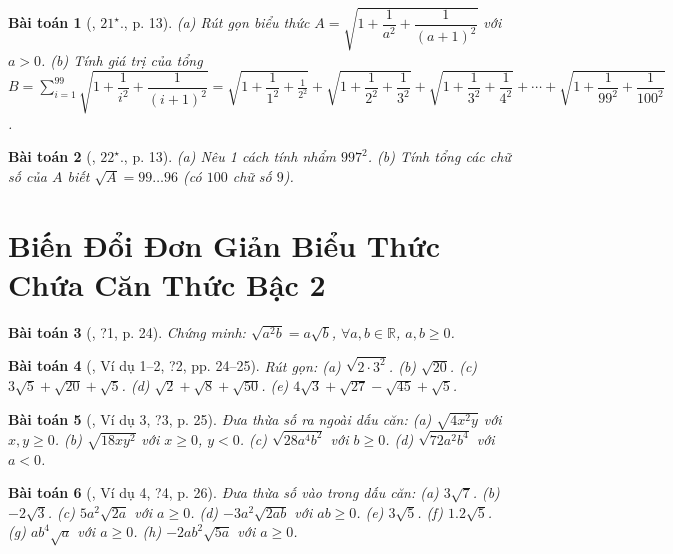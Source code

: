 \documentclass{article}
\newtheorem{baitoan}{Bài toán}
\begin{document}
\begin{baitoan}[\cite{Binh_Toan_9_tap_1}, $21^\star$., p. 13]
	(a) Rút gọn biểu thức $A = \sqrt{1 + \dfrac{1}{a^2} + \dfrac{1}{(a + 1)^2}}$ với $a > 0$. (b) Tính giá trị của tổng $B = \sum_{i=1}^{99} \sqrt{1 + \dfrac{1}{i^2} + \dfrac{1}{(i + 1)^2}} = \sqrt{1 + \dfrac{1}{1^2} + \frac{1}{2^2}} + \sqrt{1 + \dfrac{1}{2^2} + \dfrac{1}{3^2}} + \sqrt{1 + \dfrac{1}{3^2} + \dfrac{1}{4^2}} + \cdots + \sqrt{1 + \dfrac{1}{99^2} + \dfrac{1}{100^2}}$.
\end{baitoan}

\begin{baitoan}[\cite{Binh_Toan_9_tap_1}, $22^\star$., p. 13]
	(a) Nêu 1 cách tính nhẩm $997^2$. (b) Tính tổng các chữ số của $A$ biết $\sqrt{A} = 99\ldots96$ (có $100$ chữ số $9$).
\end{baitoan}


\section{Biến Đổi Đơn Giản Biểu Thức Chứa Căn Thức Bậc 2}

\begin{baitoan}[\cite{SGK_Toan_9_tap_1}, ?1, p. 24]
	Chứng minh: $\sqrt{a^2b} = a\sqrt{b}$, $\forall a,b\in\mathbb{R}$, $a,b\ge0$.
\end{baitoan}

\begin{baitoan}[\cite{SGK_Toan_9_tap_1}, Ví dụ 1--2, ?2, pp. 24--25]
	Rút gọn: (a) $\sqrt{2\cdot3^2}$. (b) $\sqrt{20}$. (c) $3\sqrt{5} + \sqrt{20} + \sqrt{5}$. (d) $\sqrt{2} + \sqrt{8} + \sqrt{50}$. (e) $4\sqrt{3} + \sqrt{27} - \sqrt{45} + \sqrt{5}$.
\end{baitoan}

\begin{baitoan}[\cite{SGK_Toan_9_tap_1}, Ví dụ 3, ?3, p. 25]
	Đưa thừa số ra ngoài dấu căn: (a) $\sqrt{4x^2y}$ với $x,y\ge0$. (b) $\sqrt{18xy^2}$ với $x\ge0$, $y < 0$. (c) $\sqrt{28a^4b^2}$ với $b\ge0$. (d) $\sqrt{72a^2b^4}$ với $a < 0$.
\end{baitoan}

\begin{baitoan}[\cite{SGK_Toan_9_tap_1}, Ví dụ 4, ?4, p. 26]
	Đưa thừa số vào trong dấu căn: (a) $3\sqrt{7}$. (b) $-2\sqrt{3}$. (c) $5a^2\sqrt{2a}$ với $a\ge0$. (d) $-3a^2\sqrt{2ab}$ với $ab\ge0$. (e) $3\sqrt{5}$. (f) $1.2\sqrt{5}$. (g) $ab^4\sqrt{a}$ với $a\ge0$. (h) $-2ab^2\sqrt{5a}$ với $a\ge0$.
\end{baitoan}
\end{document}
